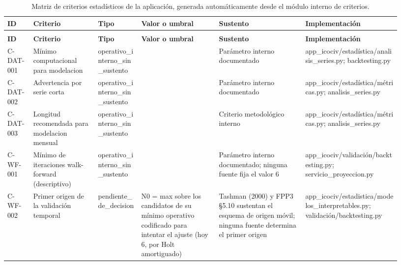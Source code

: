{\scriptsize
\begin{longtable}{@{}>{\raggedright\arraybackslash}p{0.067\linewidth}>{\raggedright\arraybackslash}p{0.153\linewidth}>{\raggedright\arraybackslash}p{0.105\linewidth}>{\raggedright\arraybackslash}p{0.182\linewidth}>{\raggedright\arraybackslash}p{0.20\linewidth}>{\raggedright\arraybackslash}p{0.22\linewidth}@{}}
\caption{Matriz de criterios estad\'isticos de la aplicaci\'on, generada autom\'aticamente desde el m\'odulo interno de criterios.}
\label{tab:matriz_criterios}\\
\toprule
\textbf{ID} & \textbf{Criterio} & \textbf{Tipo} & \textbf{Valor o umbral} & \textbf{Sustento} & \textbf{Implementaci\'on} \\
\midrule
\endfirsthead
\multicolumn{6}{l}{\emph{Continuaci\'on de la Tabla~\ref{tab:matriz_criterios}}}\\
\toprule
\textbf{ID} & \textbf{Criterio} & \textbf{Tipo} & \textbf{Valor o umbral} & \textbf{Sustento} & \textbf{Implementaci\'on} \\
\midrule
\endhead
\bottomrule
\endlastfoot
C-DAT-001 & Mínimo computacional para modelacion & operativo\_\allowbreak{}interno\_\allowbreak{}sin\_\allowbreak{}sustento & 8 & Parámetro interno documentado & app\_\allowbreak{}icociv/estadística/analisis\_\allowbreak{}series.py; backtesting.py \\
C-DAT-002 & Advertencia por serie corta & operativo\_\allowbreak{}interno\_\allowbreak{}sin\_\allowbreak{}sustento & 18 & Parámetro interno documentado & app\_\allowbreak{}icociv/estadística/métricas.py; analisis\_\allowbreak{}series.py \\
C-DAT-003 & Longitud recomendada para modelacion mensual & operativo\_\allowbreak{}interno\_\allowbreak{}sin\_\allowbreak{}sustento & 24 & Criterio metodológico interno & app\_\allowbreak{}icociv/estadística/métricas.py; analisis\_\allowbreak{}series.py \\
C-WF-001 & Mínimo de iteraciones walk-forward (descriptivo) & operativo\_\allowbreak{}interno\_\allowbreak{}sin\_\allowbreak{}sustento & 6 & Parámetro interno documentado; ninguna fuente fija el valor 6 & app\_\allowbreak{}icociv/validación/backtesting.py; servicio\_\allowbreak{}proyeccion.py \\
C-WF-002 & Primer origen de la validación temporal & pendiente\_\allowbreak{}de\_\allowbreak{}decision & N0 = max sobre los candidatos de su mínimo operativo codificado para intentar el ajuste (hoy 6, por Holt amortiguado) & Tashman (2000) y FPP3 §5.10 sustentan el esquema de origen móvil; ninguna fuente determina el primer origen & app\_\allowbreak{}icociv/estadistica/modelos\_\allowbreak{}interpretables.py; validación/backtesting.py \\

\end{longtable}}
